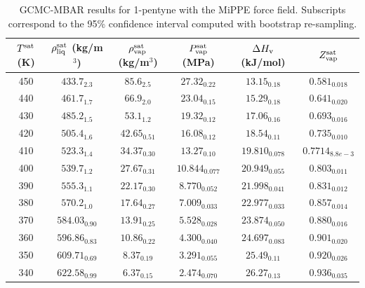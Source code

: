 \documentclass[journal=jctc,manuscript=article]{achemso}
\begin{document}
\begin{table}[htb!]
	\caption{GCMC-MBAR results for 1-pentyne with the MiPPE force field. Subscripts correspond to the 95\% confidence interval computed with bootstrap re-sampling.}
	\begin{center}
		\begin{tabular}{|c|c|c|c|c|c|}
			\hline
			$T^{\rm sat}$ (K) & $\rho_{\rm liq}^{\rm sat}$ (kg/m$^3$) & $\rho_{\rm vap}^{\rm sat}$ (kg/m$^3$) & $P_{\rm vap}^{\rm sat}$ (MPa) & $\Delta H_{\rm v}$ (kJ/mol) & $Z_{\rm vap}^{\rm sat}$ \\ \hline
			450 & $433.7_{2.3}$ & $85.6_{2.5}$ & $27.32_{0.22}$ & $13.15_{0.18}$ & $0.581_{0.018}$ \\
			440 & $461.7_{1.7}$ & $66.9_{2.0}$ & $23.04_{0.15}$ & $15.29_{0.18}$ & $0.641_{0.020}$ \\
			430 & $485.2_{1.5}$ & $53.1_{1.2}$ & $19.32_{0.12}$ & $17.06_{0.16}$ & $0.693_{0.016}$ \\
			420 & $505.4_{1.6}$ & $42.65_{0.51}$ & $16.08_{0.12}$ & $18.54_{0.11}$ & $0.735_{0.010}$ \\
			410 & $523.3_{1.4}$ & $34.37_{0.30}$ & $13.27_{0.10}$ & $19.810_{0.078}$ & $0.7714_{8.8e-3}$ \\
			400 & $539.7_{1.2}$ & $27.67_{0.31}$ & $10.844_{0.077}$ & $20.949_{0.055}$ & $0.803_{0.011}$ \\
			390 & $555.3_{1.1}$ & $22.17_{0.30}$ & $8.770_{0.052}$ & $21.998_{0.041}$ & $0.831_{0.012}$ \\
			380 & $570.2_{1.0}$ & $17.64_{0.27}$ & $7.009_{0.033}$ & $22.977_{0.033}$ & $0.857_{0.014}$ \\
			370 & $584.03_{0.90}$ & $13.91_{0.25}$ & $5.528_{0.028}$ & $23.874_{0.050}$ & $0.880_{0.016}$ \\
			360 & $596.86_{0.83}$ & $10.86_{0.22}$ & $4.300_{0.040}$ & $24.697_{0.083}$ & $0.901_{0.020}$ \\
			350 & $609.71_{0.69}$ & $8.37_{0.19}$ & $3.291_{0.055}$ & $25.49_{0.11}$ & $0.920_{0.026}$ \\
			340 & $622.58_{0.99}$ & $6.37_{0.15}$ & $2.474_{0.070}$ & $26.27_{0.13}$ & $0.936_{0.035}$ \\
			\hline
		\end{tabular}
	\end{center}
\end{table}
\end{document}
